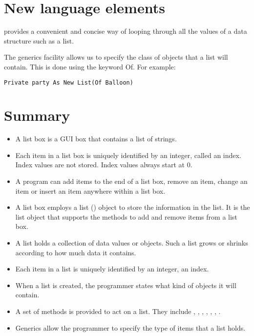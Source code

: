 	\section{New language elements}
		 provides a convenient and concise way of looping through all the values of a data structure such as a list.
	
		The generics facility allows us to specify the class of objects that a list will contain. This is done using the keyword Of. For example:
		\begin{lstlisting}
Private party As New List(Of Balloon)
		\end{lstlisting}

	\section{Summary}
		\begin{itemize}
      \item A list box is a GUI box that contains a list of strings.
      \item Each item in a list box is uniquely identified by an integer, called an index. Index values are not stored. Index values always start at 0.
      \item A program can add items to the end of a list box, remove an item, change an item or insert an item anywhere within a list box.
			\item A list box employs a list () object to store the information in the list. It is the list object that supports the methods to add and remove items from a list box.
      \item A list holds a collection of data values or objects. Such a list grows or shrinks according to how much data it contains.
      \item Each item in a list is uniquely identified by an integer, an index.
      \item When a list is created, the programmer states what kind of objects it will contain.
			\item A set of methods is provided to act on a list. They include , , , , , , .
      \item Generics allow the programmer to specify the type of items that a list holds.
		\end{itemize}

